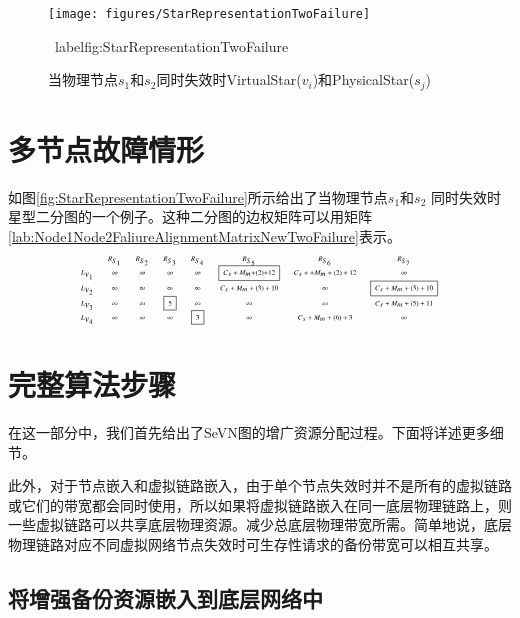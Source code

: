 \begin{figure}
\centering
\texttt{[image: figures/StarRepresentationTwoFailure]}\\
  \caption{当物理节点$s_1$和$s_2$同时失效时VirtualStar($v_i$)和PhysicalStar($s_j$)}\ label{fig:StarRepresentationTwoFailure}
\end{figure}

\section{多节点故障情形}
\label{sec:multiplePhysicalNodeFailure}
如图\ref{fig:StarRepresentationTwoFailure}所示给出了当物理节点$s_1$和$s_2$ 同时失效时星型二分图的一个例子。这种二分图的边权矩阵可以用矩阵\ref{lab:Node1Node2FaliureAlignmentMatrixNewTwoFailure}表示。
\begin{equation*}
\tiny{
 {\begin{array}{*{20}{c}}
&R_{S_1}&R_{S_2}&R_{S_3}&R_{S_4}&R_{S_5}&R_{S_6}&R_{S_{7}}\\
{L_{V_1}}&\infty&\infty&\infty&\infty&\fbox{$C_{s}+M_{m}$+(2)+12}&C_{s}++M_{m}+(2)+12&\infty\\
L_{V_2}&\infty&\infty&\infty&\infty&C_{s}+M_{m}+(3)+10&\infty&\fbox{$C_{s}+M_{m}+(3)+10$}\\
L_{V_3}&\infty&\infty&\fbox{5}&\infty&\infty&\infty&C_{s}+M_{m}+(5)+11\\
L_{V_4}&\infty&\infty&\infty&\fbox{3}&\infty&C_{s}+M_{m}+(6)+3&\infty\\
\end{array}}
}
\label{lab:Node1Node2FaliureAlignmentMatrixNewTwoFailure}
\end{equation*}
\section{完整算法步骤}
在这一部分中，我们首先给出了SeVN图的增广资源分配过程。下面将详述更多细节。

此外，对于节点嵌入和虚拟链路嵌入，由于单个节点失效时并不是所有的虚拟链路或它们的带宽都会同时使用，所以如果将虚拟链路嵌入在同一底层物理链路上，则一些虚拟链路可以共享底层物理资源。减少总底层物理带宽所需。简单地说，底层物理链路对应不同虚拟网络节点失效时可生存性请求的备份带宽可以相互共享。
\subsection{将增强备份资源嵌入到底层网络中}

